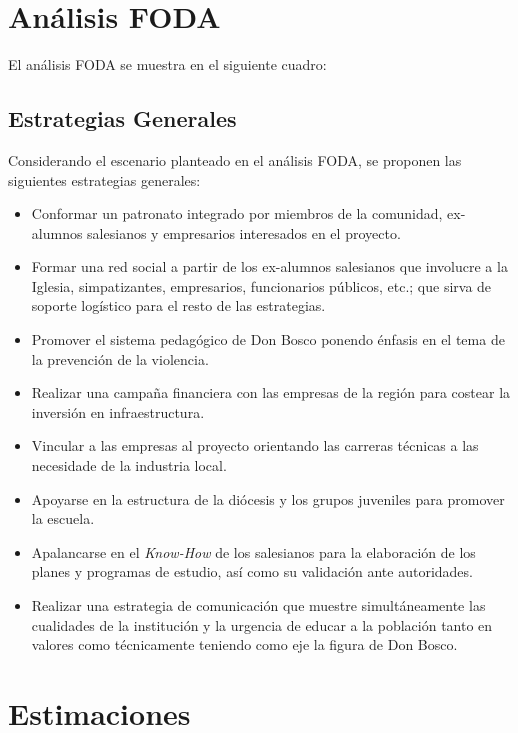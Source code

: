 

\clearpage
\section{Análisis FODA}
\label{sec:Neg:Foda}

El análisis FODA se muestra en el siguiente cuadro:



\subsection{Estrategias Generales}

Considerando el escenario planteado en el análisis FODA, se proponen las siguientes estrategias generales:

\begin{itemize}
	\item Conformar un patronato integrado por miembros de la comunidad, ex-alumnos salesianos y empresarios interesados en el proyecto.
	\item Formar una red social a partir de los ex-alumnos salesianos que involucre a la Iglesia, simpatizantes, empresarios, funcionarios públicos, etc.; que sirva de soporte logístico para el resto de las estrategias.
	\item Promover el sistema pedagógico de Don Bosco ponendo énfasis en el tema de la prevención de la violencia.
	\item Realizar una campaña financiera con las empresas de la región para costear la inversión en infraestructura.
	\item Vincular a las empresas al proyecto orientando las carreras técnicas a las necesidade de la industria local.
	\item Apoyarse en la estructura de la diócesis y los grupos juveniles para promover la escuela.
	\item Apalancarse en el \emph{Know-How} de los salesianos para la elaboración de los planes y programas de estudio, así como su validación ante autoridades.
	\item Realizar una estrategia de comunicación que muestre simultáneamente las cualidades de la institución y la urgencia de educar a la población tanto en valores como técnicamente teniendo como eje la figura de Don Bosco.
\end{itemize}

\clearpage

\section{Estimaciones}
\label{sec:Neg:Estimaciones}

